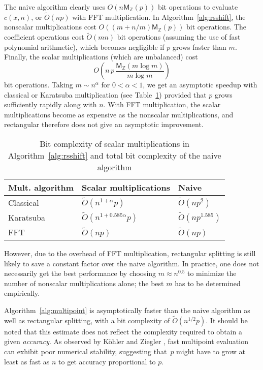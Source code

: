 \documentclass{sig-alternate}
\newcommand   \OOsoft {\tilde O}
\newcommand   \MZ     {\mathsf{M}_{\mathbb{Z}}}
\begin{document}
The naive algorithm clearly uses $O(n \MZ(p))$ bit operations
to evaluate $c(x,n)$, or $\OOsoft(np)$ with FFT multiplication.
In Algorithm~\ref{alg:rsshift}, the nonscalar
multiplications cost $O((m + n/m) \MZ(p))$ bit operations.
The coefficient operations cost $\tilde O(mn)$
bit operations (assuming the use of fast polynomial arithmetic),
which becomes negligible if $p$ grows faster than $m$.
Finally, the scalar multiplications (which are unbalanced) cost
\begin{equation*}
O\left(n \, p \, \frac{\MZ(m \log m)}{m \log m} \right)
\end{equation*}
bit operations.
Taking $m \sim n^{\alpha}$ for $0 < \alpha < 1$, we get
an asymptotic speedup with classical or Karatsuba multiplication
(see Table~\ref{tab:multalg})
provided that $p$ grows sufficiently rapidly along with $n$.
With FFT multiplication, the scalar multiplications
become as expensive as the nonscalar multiplications,
and rectangular therefore does not give an asymptotic
improvement.

\begin{table}[ht!]
\centering
\begin{tabular}{ l | l l }
Mult. algorithm & Scalar multiplications & Naive \\ \hline
Classical & $\OOsoft(n^{1+\alpha} p)$   & $\OOsoft(np^2)$ \\
Karatsuba & $\OOsoft(n^{1+0.585\alpha} p)$ & $\OOsoft(np^{1.585})$ \\
FFT       & $\OOsoft(np)$           & $\OOsoft(np)$ \\
\end{tabular}
\caption{Bit complexity of scalar multiplications in Algorithm~\ref{alg:rsshift}
and total bit complexity of the naive algorithm}
\label{tab:multalg}
\end{table}

However, due to the overhead of FFT multiplication,
rectangular splitting is still likely to save a constant
factor over the naive algorithm. In practice,
one does not necessarily get the best performance by choosing
$m \approx n^{0.5}$ to minimize the number of nonscalar multiplications alone;
the best $m$ has to be determined empirically.

Algorithm~\ref{alg:multipoint} is asymptotically
faster than the naive algorithm as well
as rectangular splitting, with a
bit complexity of $\OOsoft(n^{1/2} p)$.
It should be noted that this estimate does not reflect the complexity
required to obtain a given \emph{accuracy}.
As observed by K\"{o}hler and Ziegler \cite{KohlerZiegler2008},
fast multipoint evaluation can exhibit
poor numerical stability,
suggesting that~$p$ might have to
grow at least as fast as $n$ to get accuracy proportional to $p$.
\end{document}
